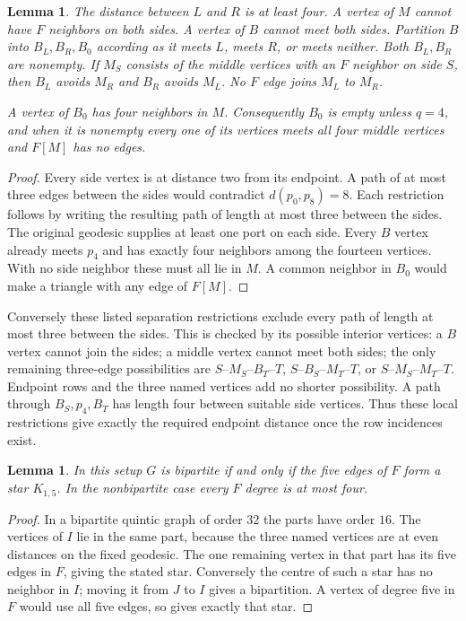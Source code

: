 \documentclass[11pt]{article}
\newtheorem{lemma}[theorem]{Lemma}
\begin{document}
\begin{lemma}\label{distance}
The distance between $L$ and $R$ is at least four. A vertex of $M$ cannot
have $F$ neighbors on both sides. A vertex of $B$ cannot meet both sides.
Partition $B$ into $B_L,B_R,B_0$ according as it meets $L$, meets $R$, or
meets neither. Both $B_L,B_R$ are nonempty. If $M_S$ consists of the middle
vertices with an $F$ neighbor on side $S$, then $B_L$ avoids $M_R$ and
$B_R$ avoids $M_L$. No $F$ edge joins $M_L$ to $M_R$.

A vertex of $B_0$ has four neighbors in $M$. Consequently $B_0$ is empty
unless $q=4$, and when it is nonempty every one of its vertices meets all
four middle vertices and $F[M]$ has no edges.
\end{lemma}
\begin{proof}
Every side vertex is at distance two from its endpoint. A path of at most
three edges between the sides would contradict $d(p_0,p_8)=8$. Each
restriction follows by writing the resulting path of length at most
three between the sides. The original geodesic supplies at least one
port on each side. Every $B$ vertex already meets $p_4$ and has exactly
four neighbors among the fourteen vertices. With no side neighbor these
must all lie in $M$. A common neighbor in $B_0$ would make a triangle
with any edge of $F[M]$.
\end{proof}

Conversely these listed separation restrictions exclude every path of
length at most three between the sides. This is checked by its possible
interior vertices: a $B$ vertex cannot join the sides; a middle vertex
cannot meet both sides; the only remaining three-edge possibilities
are $S$--$M_S$--$B_T$--$T$, $S$--$B_S$--$M_T$--$T$, or
$S$--$M_S$--$M_T$--$T$. Endpoint rows and the three named vertices add
no shorter possibility. A path through $B_S,p_4,B_T$ has length four
between suitable side vertices. Thus these local restrictions give
exactly the required endpoint distance once the row incidences exist.

\begin{lemma}\label{star}
In this setup $G$ is bipartite if and only if the five edges of $F$ form
a star $K_{1,5}$. In the nonbipartite case every $F$ degree is at most four.
\end{lemma}
\begin{proof}
In a bipartite quintic graph of order $32$ the parts have order $16$.
The vertices of $I$ lie in the same part, because the three named
vertices are at even distances on the fixed geodesic. The one remaining
vertex in that part has its five edges in $F$, giving the stated star.
Conversely the centre of such a star has no neighbor in $I$; moving it
from $J$ to $I$ gives a bipartition. A vertex of degree five in $F$
would use all five edges, so gives exactly that star.
\end{proof}
\end{document}
